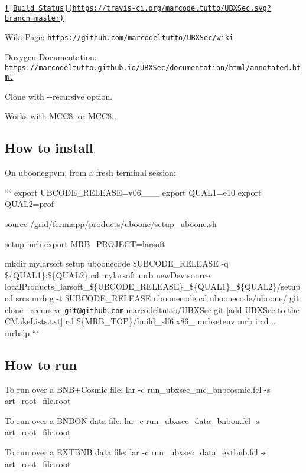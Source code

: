\href{https://travis-ci.org/marcodeltutto/UBXSec}{\tt !\mbox{[}Build Status\mbox{]}(https\-://travis-\/ci.\-org/marcodeltutto/\-U\-B\-X\-Sec.\-svg?branch=master)}

Wiki Page\-: \href{https://github.com/marcodeltutto/UBXSec/wiki}{\tt https\-://github.\-com/marcodeltutto/\-U\-B\-X\-Sec/wiki}

Doxygen Documentation\-: \href{https://marcodeltutto.github.io/UBXSec/documentation/html/annotated.html}{\tt https\-://marcodeltutto.\-github.\-io/\-U\-B\-X\-Sec/documentation/html/annotated.\-html}

Clone with {\ttfamily -\/-\/recursive} option.

Works with M\-C\-C8. or M\-C\-C8..

\subsection*{How to install}

On uboonegpvm, from a fresh terminal session\-:

``` export U\-B\-C\-O\-D\-E\-\_\-\-R\-E\-L\-E\-A\-S\-E=v06\-\_\-\_\-\_ export Q\-U\-A\-L1=e10 export Q\-U\-A\-L2=prof

source /grid/fermiapp/products/uboone/setup\-\_\-uboone.sh

setup mrb export M\-R\-B\-\_\-\-P\-R\-O\-J\-E\-C\-T=larsoft

mkdir mylarsoft setup uboonecode \$\-U\-B\-C\-O\-D\-E\-\_\-\-R\-E\-L\-E\-A\-S\-E -\/q \$\{Q\-U\-A\-L1\}\-:\$\{Q\-U\-A\-L2\} cd mylarsoft mrb new\-Dev source local\-Products\-\_\-larsoft\-\_\-\$\{U\-B\-C\-O\-D\-E\-\_\-\-R\-E\-L\-E\-A\-S\-E\}\-\_\-\$\{Q\-U\-A\-L1\}\-\_\-\$\{Q\-U\-A\-L2\}/setup cd srcs mrb g -\/t \$\-U\-B\-C\-O\-D\-E\-\_\-\-R\-E\-L\-E\-A\-S\-E uboonecode cd uboonecode/uboone/ git clone --recursive \href{mailto:git@github.com}{\tt git@github.\-com}\-:marcodeltutto/\-U\-B\-X\-Sec.\-git \mbox{[}add \hyperlink{classUBXSec}{U\-B\-X\-Sec} to the C\-Make\-Lists.\-txt\mbox{]} cd \$\{M\-R\-B\-\_\-\-T\-O\-P\}/build\-\_\-slf6.x86\-\_ mrbsetenv mrb i cd .. mrbslp ```

\subsection*{How to run}

To run over a B\-N\-B+\-Cosmic file\-: {\ttfamily lar -\/c run\-\_\-ubxsec\-\_\-mc\-\_\-bnbcosmic.\-fcl -\/s art\-\_\-root\-\_\-file.\-root}

To run over a B\-N\-B\-O\-N data file\-: {\ttfamily lar -\/c run\-\_\-ubxsec\-\_\-data\-\_\-bnbon.\-fcl -\/s art\-\_\-root\-\_\-file.\-root}

To run over a E\-X\-T\-B\-N\-B data file\-: {\ttfamily lar -\/c run\-\_\-ubxsec\-\_\-data\-\_\-extbnb.\-fcl -\/s art\-\_\-root\-\_\-file.\-root} 